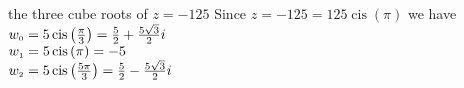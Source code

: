 { the three cube roots of $z = -125$}
{ Since $z = -125 = 125\operatorname{cis}\left(\pi\right)$ we have \\$w_{\text{\tiny$0$}} = 5\operatorname{cis}\left(\frac{\pi}{3}\right) = \frac{5}{2} + \frac{5\sqrt{3}}{2} i$\\$w_{\text{\tiny$1$}} =5\operatorname{cis}\left(\pi\right) = -5$\\$w_{\text{\tiny$2$}} = 5\operatorname{cis}\left(\frac{5\pi}{3}\right) = \frac{5}{2} - \frac{5\sqrt{3}}{2} i$}
